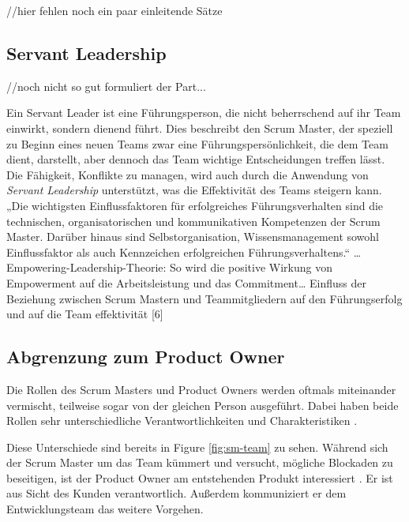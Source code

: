 \documentclass[5pt, final]{beamer}
\begin{document}
\begin{frame}[t]
\begin{multicols}{3}
            //hier fehlen noch ein paar einleitende Sätze
            
            \subsection{Servant Leadership}
			
			//noch nicht so gut formuliert der Part...
			
			Ein Servant Leader ist eine Führungsperson, die nicht beherrschend auf ihr Team einwirkt, sondern dienend führt.
            Dies beschreibt den Scrum Master, der speziell zu Beginn eines neuen Teams zwar eine Führungspersönlichkeit, die dem Team dient, darstellt, aber dennoch das Team wichtige Entscheidungen treffen lässt.
            Die Fähigkeit, Konflikte zu managen, wird auch durch die Anwendung von \textit{Servant Leadership} unterstützt, was die Effektivität des Teams steigern kann.
			„Die wichtigsten Einflussfaktoren für erfolgreiches Führungsverhalten sind die technischen, organisatorischen und kommunikativen Kompetenzen der Scrum Master. Darüber hinaus sind Selbstorganisation, Wissensmanagement sowohl Einflussfaktor als auch Kennzeichen erfolgreichen Führungsverhaltens.“ …
            Empowering-Leadership-Theorie: So wird die positive Wirkung von Empowerment auf die Arbeitsleistung und das Commitment… Einfluss der Beziehung zwischen Scrum Mastern und Teammitgliedern auf den Führungserfolg und auf die Team effektivität [6]
			
			\subsection{Abgrenzung zum Product Owner}
			
            Die Rollen des Scrum Masters und Product Owners werden oftmals miteinander vermischt, teilweise sogar von der gleichen Person ausgeführt.
            Dabei haben beide Rollen sehr unterschiedliche Verantwortlichkeiten und Charakteristiken \cite{sutherland14}.
            
            Diese Unterschiede sind bereits in Figure \ref{fig:sm-team} zu sehen.
            Während sich der Scrum Master um das Team kümmert und versucht, mögliche Blockaden zu beseitigen, ist der Product Owner am entstehenden Produkt interessiert \cite{Spiegler21}.
            Er ist aus Sicht des Kunden verantwortlich.
            Außerdem kommuniziert er dem Entwicklungsteam das weitere Vorgehen.
            

\end{multicols}
\end{frame}
\end{document}
